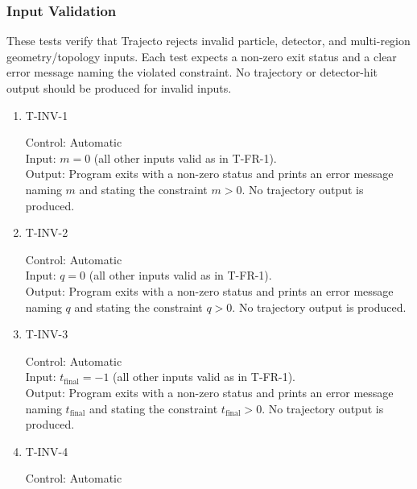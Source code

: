 \documentclass[12pt, titlepage]{article}
\providecommand{\progname}[1]{#1}
\begin{document}
\subsubsection{Input Validation} \label{sec:inputval}

These tests verify that \progname{Trajecto} rejects invalid particle,
detector, and multi-region geometry/topology inputs. Each test expects a
non-zero exit status and a clear error message naming the violated constraint.
No trajectory or detector-hit output should be produced for invalid inputs.

\begin{enumerate}

\item{T-INV-1\\}

Control: Automatic\\

Input: $m = 0$ (all other inputs valid as in T-FR-1).\\

Output: Program exits with a non-zero status and prints an error message naming
$m$ and stating the constraint $m > 0$.  No trajectory output is produced.

\item{T-INV-2\\}

Control: Automatic\\

Input: $q = 0$ (all other inputs valid as in T-FR-1).\\

Output: Program exits with a non-zero status and prints an error message naming
$q$ and stating the constraint $q > 0$.  No trajectory output is produced.

\item{T-INV-3\\}

Control: Automatic\\

Input: $t_{\text{final}} = -1$ (all other inputs valid as in T-FR-1).\\

Output: Program exits with a non-zero status and prints an error message naming
$t_{\text{final}}$ and stating the constraint $t_{\text{final}} > 0$.  No
trajectory output is produced.

\item{T-INV-4\\}

Control: Automatic\\


\end{enumerate}
\end{document}

